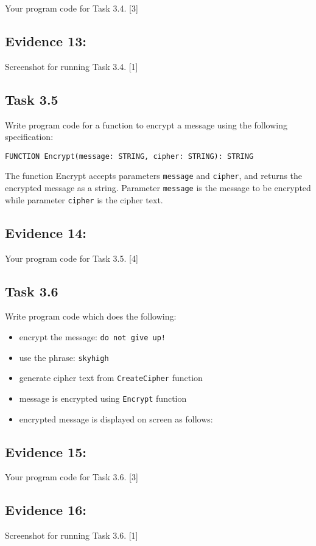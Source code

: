Your program code for Task 3.4. \hfill{}{[}3{]}

\subsection*{Evidence 13:}

Screenshot for running Task 3.4.\hfill{} {[}1{]}

\subsection*{Task 3.5 }

Write program code for a function to encrypt a message using the following
specification:
\noindent \begin{center}
\texttt{FUNCTION Encrypt(message: STRING, cipher: STRING): STRING }
\par\end{center}

The function Encrypt accepts parameters \texttt{message} and \texttt{cipher},
and returns the encrypted message as a string. Parameter \texttt{message}
is the message to be encrypted while parameter \texttt{cipher} is
the cipher text. 

\subsection*{Evidence 14: }

Your program code for Task 3.5. \hfill{}{[}4{]}

\subsection*{Task 3.6 }

Write program code which does the following: 
\begin{itemize}
\item encrypt the message: \textquotedbl\texttt{do not give up!}\textquotedbl{} 
\item use the phrase: \textquotedbl\texttt{skyhigh}\textquotedbl{} 
\item generate cipher text from \texttt{CreateCipher} function
\item message is encrypted using \texttt{Encrypt} function 
\item encrypted message is displayed on screen as follows: 

\noindent{}
\end{itemize}

\subsection*{Evidence 15: }

Your program code for Task 3.6. \hfill{} {[}3{]}

\subsection*{Evidence 16:}

Screenshot for running Task 3.6. \hfill{}{[}1{]}